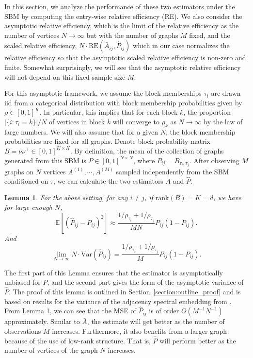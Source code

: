 \documentclass[10pt,letterpaper]{article}
\newtheorem{lemma}[fact]{Lemma}
\newcommand{\Ex}{\mathbb{E}}
\renewcommand{\hat}{\widehat}
\begin{document}
In this section, we analyze the performance of these two estimators under the SBM by computing the entry-wise relative efficiency (RE).
We also consider the asymptotic relative efficiency, which is the limit of the relative efficiency as the number of vertices $N\to\infty$ but with the number of graphs $M$ fixed, and the scaled relative efficiency, $N\cdot \mathrm{RE}(\bar{A}_{ij},\hat{P}_{ij}) $ which in our case normalizes the relative efficiency so that the asymptotic scaled relative efficiency is non-zero and finite. Somewhat surprisingly, we will see that the asymptotic relative efficiency will not depend on this fixed sample size $M$.

For this asymptotic framework, we assume the block memberships $\tau_i$ are drawn iid from a categorical distribution with block membership probabilities given by $\rho\in[0,1]^K$.
In particular, this implies that for each block $k$, the proportion $|\{i:\tau_i=k\}|/N$ of vertices in block $k$ will converge to $\rho_k$ as $N\to\infty$ by the law of large numbers.
We will also assume that for a given $N$, the block membership probabilities are fixed for all graphs.
Denote block probability matrix $B = \nu \nu^{\top} \in [0, 1]^{K \times K}$. 
By definition, the mean of the collection of graphs generated from this SBM is $P \in [0, 1]^{N \times N}$, where $P_{ij} = B_{\tau_i, \tau_j}$. After observing $M$ graphs on $N$ vertices $A^{(1)}, \cdots, A^{(M)}$ sampled independently from the SBM conditioned on $\tau$, we can calculate the two estimators $\bar{A}$ and $\hat{P}$.

\begin{lemma}
\label{lm:VarPhat}
For the above setting, for any $i \ne j$, if $\mathrm{rank}(B)=K=d$, we have for large enough $N$,
\[
    \Ex[(\hat{P}_{ij} - P_{ij})^2] \approx
    \frac{1/\rho_{\tau_i} + 1/\rho_{\tau_j}}{M N} P_{ij}(1-P_{ij}).
\]
And
\[
    \lim_{N \to \infty} N \cdot \mathrm{Var}(\hat{P}_{ij}) =
    \frac{1/\rho_{\tau_i} + 1/\rho_{\tau_j}}{M} P_{ij} (1 - P_{ij}).
\]
\end{lemma}
The first part of this Lemma ensures that the estimator is asymptotically unbiased for $P$,
and the second part gives the form of the asymptotic variance of $\hat{P}$.
The proof of this lemma is outlined in Section~\ref{section:outline_proof} and is based on results for the variance of the adjacency spectral embedding from \citet{athreya2013limit}. From Lemma \ref{lm:VarPhat}, we can see that the MSE of $\hat{P}_{ij}$ is of order $O(M^{-1}N^{-1})$ approximately. Similar to $\bar{A}$, the estimate will get better as the number of observations $M$ increases. Furthermore, it also benefits from a larger graph because of the use of low-rank structure. That is, $\hat{P}$ will perform better as the number of vertices of the graph $N$ increases.
\end{document}
